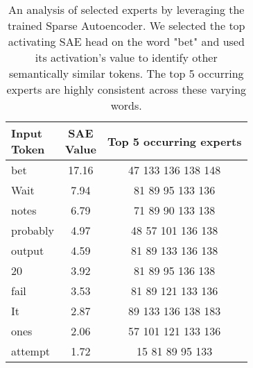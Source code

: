 \begin{table}[]
    \centering
    \begin{tabular}{lcc}
        \makecell{Input \\ Token} & \makecell{SAE \\ Value}  & Top 5 occurring experts \\
        \toprule
         bet & 17.16 & 47 \hfill 133 \hfill 136 \hfill 138 \hfill 148 \\
         Wait & 7.94 & 81 \hfill 89 \hfill 95 \hfill 133 \hfill 136 \\
         notes & 6.79 & 71 \hfill 89 \hfill 90 \hfill 133 \hfill 138 \\
         probably & 4.97 & 48 \hfill 57 \hfill 101 \hfill 136 \hfill 138 \\
         output & 4.59 & 81 \hfill 89 \hfill 133 \hfill 136 \hfill 138 \\
         20 & 3.92 & 81 \hfill 89 \hfill 95 \hfill 136 \hfill 138 \\
         fail & 3.53 & 81 \hfill 89 \hfill 121 \hfill 133 \hfill 136 \\
         It & 2.87 & 89 \hfill 133 \hfill 136 \hfill 138 \hfill 183 \\
         ones & 2.06 & 57 \hfill 101 \hfill 121 \hfill 133 \hfill 136 \\
         attempt & 1.72 & 15 \hfill 81 \hfill 89 \hfill 95 \hfill 133 \\
        \bottomrule
    \end{tabular}
    \caption{An analysis of selected experts by leveraging the trained Sparse Autoencoder. We selected the top activating SAE head on the word "bet" and used its activation's value to identify other semantically similar tokens. The top 5 occurring experts are highly consistent across these varying words.}
    \label{tab:sae_bet}
\end{table}

